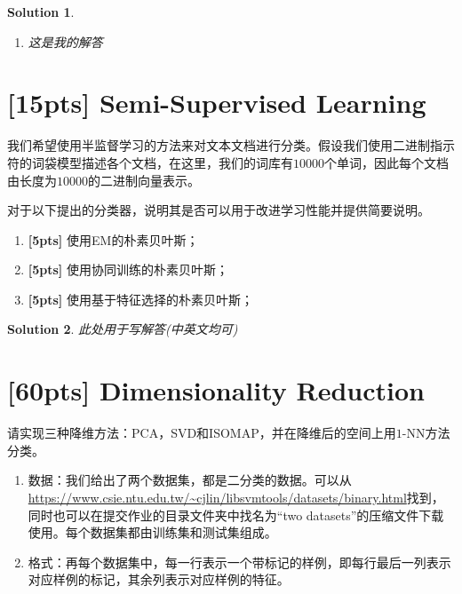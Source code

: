 \documentclass[a4paper,UTF8]{article}
\numberwithin{equation}{section}
\newtheorem*{solution}{Solution}
\begin{document}
\begin{solution}
\begin{enumerate}
\begin{eqnarray}
		\end{eqnarray}
		定义指示函数：
		$$\mathbb{I}(y=j)=
		\begin{cases}
		1& \text{若$y$等于$j$}\\
		0& \text{若$y$不等于$j$}
		\end{cases}$$
		给定数据集为$\{(\mathbf{x_i}, y_i)\}_{i=1}^m$，则其对数似然为：
		\begin{eqnarray}
			l &=& \sum_{i=1}^m\sum_{k=1}^K\mathbb{I}(y_i=k)\ln{p(y_i|\mathbf{x_i})}
		\end{eqnarray}
	\item 这是我的解答
\end{enumerate}
\end{solution}
\newpage

\section{[15pts] Semi-Supervised Learning}
我们希望使用半监督学习的方法来对文本文档进行分类。假设我们使用二进制指示符的词袋模型描述各个文档，在这里，我们的词库有$10000$个单词，因此每个文档由长度为$10000$的二进制向量表示。

对于以下提出的分类器，说明其是否可以用于改进学习性能并提供简要说明。
\begin{enumerate}
	\item \textbf{[5pts]} 使用EM的朴素贝叶斯；
	\item \textbf{[5pts]} 使用协同训练的朴素贝叶斯；
	\item \textbf{[5pts]} 使用基于特征选择的朴素贝叶斯；
\end{enumerate}

\begin{solution}
此处用于写解答(中英文均可)
\end{solution}
\newpage

\section{[60pts] Dimensionality Reduction}
请实现三种降维方法：PCA，SVD和ISOMAP，并在降维后的空间上用$1$-NN方法分类。
\begin{enumerate}
	\item 数据：我们给出了两个数据集，都是二分类的数据。可以从\url{https://www.csie.ntu.edu.tw/~cjlin/libsvmtools/datasets/binary.html}找到，同时也可以在提交作业的目录文件夹中找名为“two datasets”的压缩文件下载使用。每个数据集都由训练集和测试集组成。
	\item 格式：再每个数据集中，每一行表示一个带标记的样例，即每行最后一列表示对应样例的标记，其余列表示对应样例的特征。
\end{enumerate}
\end{document}
